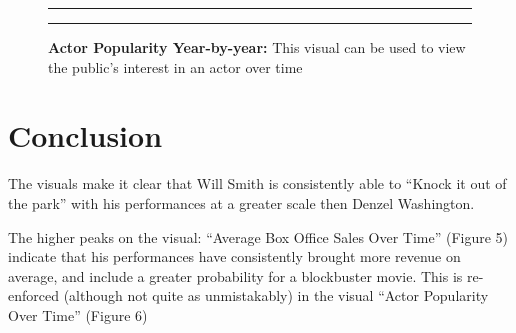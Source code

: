 \documentclass[]{article}
\begin{document}
\begin{figure}[!ht]
 \label{fig:one-graphic}
    \begin{center}
    \end{center}
    \hrule
      \vspace{2mm}
    \caption{ \textbf{Actor Popularity Year-by-year:} \newline \footnotesize{ This visual
    can be used to view the public's interest in an actor over time}  }
    \vspace{2mm}
    \hrule
\end{figure}

\section{Conclusion}
\label{sec:conclusion}

The visuals make it clear that Will Smith is consistently able to
``Knock it out of the park'' with his performances at a greater scale
then Denzel Washington. \newline

\noindent The higher peaks on the visual: ``Average Box Office Sales
Over Time'' (Figure 5) indicate that his performances have consistently
brought more revenue on average, and include a greater probability for a
blockbuster movie. This is re-enforced (although not quite as
unmistakably) in the visual ``Actor Popularity Over Time'' (Figure 6)
\newline
\end{document}
